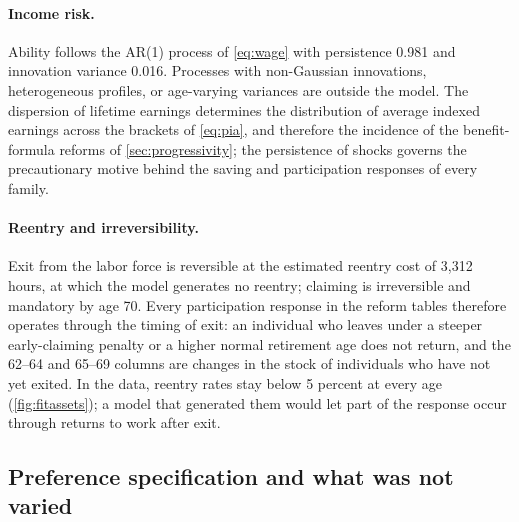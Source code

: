 \paragraph{Income risk.}
Ability follows the AR(1) process of \eqref{eq:wage} with persistence 0.981 and innovation variance 0.016. %
Processes with non-Gaussian innovations, heterogeneous profiles, or age-varying variances \citep{storesletten2004consumption,heathcote2010unequal,guvenen2013data} are outside the model. The dispersion of lifetime earnings determines the distribution of average indexed earnings across the brackets of \eqref{eq:pia}, and therefore the incidence of the benefit-formula reforms of \autoref{sec:progressivity}; the persistence of shocks governs the precautionary motive behind the saving and participation responses of every family.

\paragraph{Reentry and irreversibility.}
Exit from the labor force is reversible at the estimated reentry cost of 3,312 hours, at which the model generates no reentry; claiming is irreversible and mandatory by age 70. %
Every participation response in the reform tables therefore operates through the timing of exit: an individual who leaves under a steeper early-claiming penalty or a higher normal retirement age does not return, and the 62--64 and 65--69 columns are changes in the stock of individuals who have not yet exited. In the data, reentry rates stay below 5 percent at every age (\autoref{fig:fitassets}); a model that generated them would let part of the response occur through returns to work after exit. %

\subsection{Preference specification and what was not varied}\label{subsec:notvaried}

